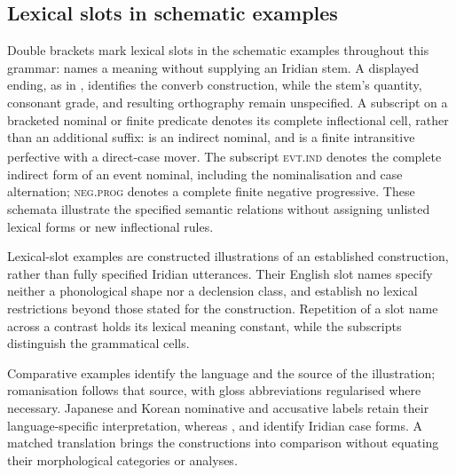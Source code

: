 \subsection{Lexical slots in schematic examples}
\label{sec:lexical-slot-schemata}
Double brackets mark lexical slots in the schematic examples throughout
this grammar:
\ird{[[paddle]]} names a meaning without supplying an Iridian stem.
A displayed ending, as in , identifies the converb
construction, while the stem's quantity, consonant grade, and resulting
orthography remain unspecified. A subscript on a bracketed nominal or finite
predicate denotes its complete inflectional cell, rather than an additional
suffix: \ird{[[hands]]}\textsubscript{\Ind{}} is an indirect nominal,
and \ird{[[depart]]}\textsubscript{\Pf{}} is a finite intransitive
perfective with a direct-case mover. The subscript \textsc{evt.ind}
denotes the complete indirect form of an event nominal, including the
nominalisation and case alternation; \textsc{neg.prog} denotes a complete
finite negative progressive. These schemata illustrate the specified semantic
relations without assigning unlisted lexical forms or new inflectional rules.

Lexical-slot examples are constructed illustrations of an established
construction, rather than fully specified Iridian utterances. Their English
slot names specify neither a phonological shape nor a declension class,
and establish no lexical restrictions beyond those stated for the
construction. Repetition of a slot name across a contrast holds its lexical
meaning constant, while the subscripts distinguish the grammatical cells.

Comparative examples identify the language and the source of the illustration;
romanisation follows that source, with gloss abbreviations regularised where
necessary. Japanese and Korean nominative and accusative labels retain their
language-specific interpretation, whereas \Dir{}, \Trs{} and \Ind{}
identify Iridian case forms. A matched translation brings the constructions
into comparison without equating their morphological categories or analyses.
